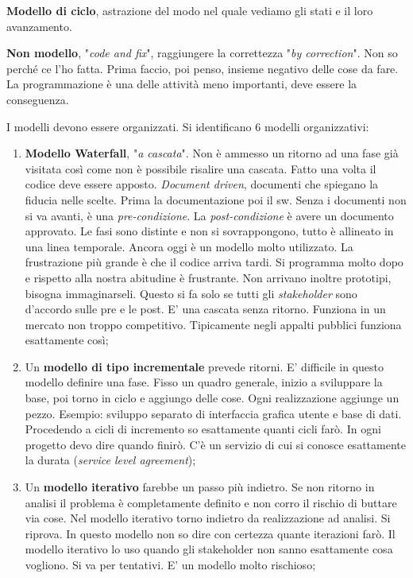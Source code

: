 \textbf{Modello di ciclo}, astrazione del modo nel quale vediamo gli stati e il loro avanzamento.

\textbf{Non modello}, "\textit{code and fix}", raggiungere la correttezza "\textit{by correction}". Non so perché ce l'ho fatta. Prima faccio, poi penso, insieme negativo delle cose da fare. La programmazione è una delle attività meno importanti, deve essere la conseguenza.

I modelli devono essere organizzati. Si identificano 6 modelli organizzativi:

\begin{enumerate}

	\item \textbf{Modello Waterfall}, "\textit{a cascata}". Non è ammesso un ritorno ad una fase già visitata così come non è possibile risalire una cascata. Fatto una volta il codice deve essere apposto. \textit{Document driven}, documenti che spiegano la fiducia nelle scelte. Prima la documentazione poi il sw. Senza i documenti non si va avanti, è una \textit{pre-condizione}. La \textit{post-condizione} è avere un documento approvato. Le fasi sono distinte e non si sovrappongono, tutto è allineato in una linea temporale. Ancora oggi è un modello molto utilizzato. La frustrazione più grande è che il codice arriva tardi. Si programma molto dopo e rispetto alla nostra abitudine è frustrante. Non arrivano inoltre prototipi, bisogna immaginarseli. Questo si fa solo se tutti gli \textit{stakeholder} sono d'accordo sulle pre e le post. E' una cascata senza ritorno. Funziona in un mercato non troppo competitivo. Tipicamente negli appalti pubblici funziona esattamente così;
	
	\item Un \textbf{modello di tipo incrementale} prevede ritorni. E' difficile in questo modello definire una fase. Fisso un quadro generale, inizio a sviluppare la base, poi torno in ciclo e aggiungo delle cose. Ogni realizzazione aggiunge un pezzo. Esempio: sviluppo separato di interfaccia grafica utente e base di dati. Procedendo a cicli di incremento so esattamente quanti cicli farò. In ogni progetto devo dire quando finirò. C'è un servizio di cui si conosce esattamente la durata (\textit{service level agreement});
	
	\item Un \textbf{modello iterativo} farebbe un passo più indietro. Se non ritorno in analisi il problema è completamente definito e non corro il rischio di buttare via cose. Nel modello iterativo torno indietro da realizzazione ad analisi. Si riprova. In questo modello non so dire con certezza quante iterazioni farò. Il modello iterativo lo uso quando gli stakeholder non sanno esattamente cosa vogliono. Si va per tentativi. E' un modello molto rischioso;
	

\end{enumerate}
